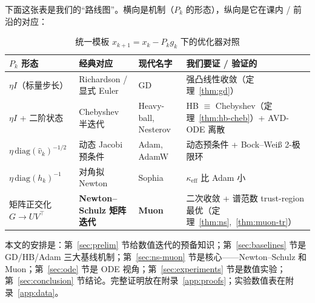 下面这张表是我们的``路线图''。横向是机制（$P_k$ 的形态），纵向是它在课内 / 前沿的对应：

\begin{table}[htbp]
  \centering
  \caption{统一模板 $x_{k+1}=x_k-P_k g_k$ 下的优化器对照}
  \label{tab:roadmap}
  \small
  \begin{tabularx}{\textwidth}{@{}lXXX@{}}
    \toprule
    $P_k$ 形态 & 经典对应 & 现代名字 & 我们要证 / 验证的 \\
    \midrule
    $\eta I$（标量步长） & Richardson / 显式 Euler & GD & 强凸线性收敛（定理~\ref{thm:gd}） \\
    $\eta I$ + 二阶状态 & Chebyshev 半迭代 & Heavy-ball, Nesterov & HB $\equiv$ Chebyshev（定理~\ref{thm:hb-cheb}）+ AVD-ODE 离散 \\
    $\eta\,\mathrm{diag}(\hat v_k)^{-1/2}$ & 动态 Jacobi 预条件 & Adam, AdamW & 动态预条件 + Bock--Wei{\ss} 2-极限环 \\
    $\eta\,\mathrm{diag}(h_k)^{-1}$ & 对角拟 Newton & Sophia & $\kappa_{\mathrm{eff}}$ 比 Adam 小 \\
    矩阵正交化 $G\to U V^\top$ & \textbf{Newton--Schulz 矩阵迭代} & \textbf{Muon} & 二次收敛 + 谱范数 trust-region 最优（定理~\ref{thm:ns},~\ref{thm:muon-tr}） \\
    \bottomrule
  \end{tabularx}
\end{table}

本文的安排是：第~\ref{sec:prelim} 节给数值迭代的预备知识；第~\ref{sec:baselines} 节是 GD/HB/Adam 三大基线机制；第~\ref{sec:ns-muon} 节是核心——Newton--Schulz 和 Muon；第~\ref{sec:ode} 节是 ODE 视角；第~\ref{sec:experiments} 节是数值实验；第~\ref{sec:conclusion} 节结论。完整证明放在附录~\ref{app:proofs}；实验数值表在附录~\ref{app:data}。
